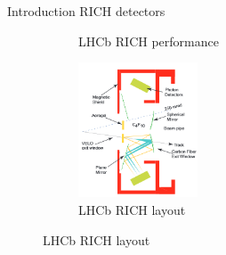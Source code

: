 \documentclass{beamer}
\begin{document}
\begin{frame}{Introduction RICH detectors}
\begin{figure}
\begin{subfigure}{0.35\textwidth}
      \caption{LHCb RICH performance}
    \end{subfigure}%
    \begin{subfigure}{0.3\textwidth}
      \vspace{-1cm}
      \includegraphics[height = 4.0cm]{Plots/LHCb_RICH.png}
      \caption{LHCb RICH layout}
    \end{subfigure}
  \end{figure}
\end{frame}
\end{document}
